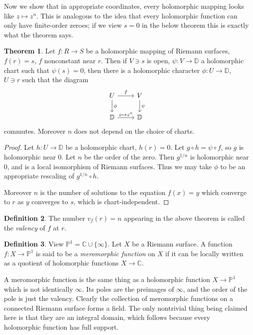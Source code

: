 \documentclass[12pt]{report}
\newcommand{\CC}{\mathbb{C}}
\newcommand{\PP}{\mathbb{P}}
\newcommand{\DD}{\mathbb{D}}
\newcommand{\dfn}[1]{\emph{#1}\index{#1}}
\theoremstyle{definition}
\newtheorem{theorem}{Theorem}[chapter]
\newtheorem{definition}[theorem]{Definition}
\begin{document}
Now we show that in appropriate coordinates, every holomorphic mapping looks like $z \mapsto z^n$.
This is analogous to the idea that every holomorphic function can only have finite-order zeroes; if we view $s = 0$ in the below theorem this is exactly what the theorem says.
\begin{theorem}
Let $f: R \to S$ be a holomorphic mapping of Riemann surfaces, $f(r) = s$, $f$ nonconstant near $r$.
Then if $V \ni s$ is open, $\psi: V \to \DD$ a holomorphic chart such that $\psi(s) = 0$, then there is a holomorphic character $\phi: U \to \DD$, $U \ni r$ such that the diagram
$$\begin{tikzcd} U \arrow[r,"f"] \arrow[d,"\phi"] & V \arrow[d,"\psi"]\\
\DD \arrow[r,"z \mapsto z^n"] & \DD
\end{tikzcd}$$
commutes. Moreover $n$ does not depend on the choice of charts.
\end{theorem}
\begin{proof}
Let $h: U \to \DD$ be a holomorphic chart, $h(r) = 0$. Let $g \circ h = \psi \circ f$, so $g$ is holomorphic near $0$.
Let $n$ be the order of the zero. Then $g^{1/n}$ is holomorphic near $0$, and is a local isomorphism of Riemann surfaces.
Thus we may take $\phi$ to be an appropriate rescaling of $g^{1/n} \circ h$.

Moreover $n$ is the number of solutions to the equation $f(x) = y$ which converge to $r$ as $y$ converges to $s$, which is chart-independent.
\end{proof}
\begin{definition}
The number $v_f(r) = n$ appearing in the above theorem is called the \dfn{valency} of $f$ at $r$.
\end{definition}

\begin{definition}
View $\PP^1 = \CC \cup \{\infty\}$. Let $X$ be a Riemann surface. A function $f: X \to \PP^1$ is said to be a \dfn{meromorphic function} on $X$ if it can be locally written as a quotient of holomorphic functions $X \to \CC$.
\end{definition}
A meromorphic function is the same thing as a holomorphic function $X \to \PP^1$ which is not identically $\infty$. Its poles are the preimages of $\infty$, and the order of the pole is just the valency.
Clearly the collection of meromorphic functions on a connected Riemann surface forms a field. The only nontrivial thing being claimed here is that they are an integral domain, which follows because every holomorphic function has full support.
\end{document}
